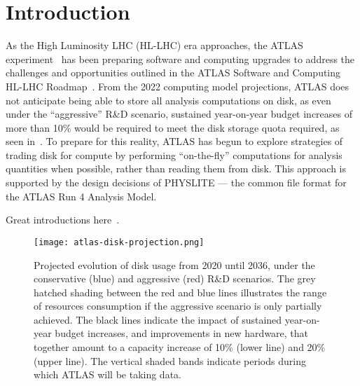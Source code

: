\section{Introduction}\label{sec:introduction}

As the High Luminosity LHC (HL-LHC) era approaches, the ATLAS experiment~\cite{PERF-2007-01} has been preparing software and computing upgrades to address the challenges and opportunities outlined in the ATLAS Software and Computing HL-LHC Roadmap~\cite{CERN-LHCC-2022-005}.
From the 2022 computing model projections, ATLAS does not anticipate being able to store all analysis computations on disk, as even under the ``aggressive'' R\&D scenario, sustained year-on-year budget increases of more than 10\% would be required to meet the disk storage quota required, as seen in~.
To prepare for this reality, ATLAS has begun to explore strategies of trading disk for compute by performing ``on-the-fly'' computations for analysis quantities when possible, rather than reading them from disk.
This approach is supported by the design decisions of PHYSLITE --- the common file format for the ATLAS Run 4 Analysis Model.


Great introductions here~\cite{CERN-LHCC-2022-005,nanobind}.

\begin{figure}
    \centering
    \texttt{[image: atlas-disk-projection.png]}
    \caption{Projected evolution of disk usage from 2020 until 2036, under the conservative (blue) and aggressive (red) R\&D scenarios.
The grey hatched shading between the red and blue lines illustrates the range of resources consumption if the aggressive scenario is only partially achieved.
The black lines indicate the impact of sustained year-on-year budget increases, and improvements in new hardware, that together amount to a capacity increase of 10\% (lower line) and 20\% (upper line).
The vertical shaded bands indicate periods during which ATLAS will be taking data.~\cite{CERN-LHCC-2022-005}}
    \label{fig:atlas-disk-projection}
\end{figure}
